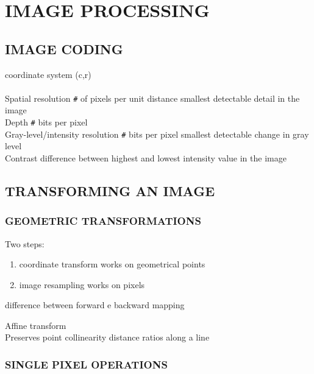 \documentclass[11pt,english]{article}
\begin{document}
\section{IMAGE PROCESSING}
	
\subsection{IMAGE CODING}						
coordinate system (c,r) \\ 
\\
Spatial resolution \makebox[0.5cm]{\textrightarrow} \verb|#| of pixels per unit distance \makebox[0.5cm]{\textrightarrow} smallest detectable detail in the image \\
Depth \makebox[0.5cm]{\textrightarrow} \verb|#| bits per pixel \\
Gray-level/intensity resolution \makebox[0.5cm]{\textrightarrow} \verb|#| bits per pixel \makebox[0.5cm]{\textrightarrow} smallest detectable change in gray level \\
Contrast \makebox[0.5cm]{\textrightarrow} difference between highest and lowest intensity value in the image \\

\subsection{TRANSFORMING AN IMAGE}

\subsubsection*{GEOMETRIC TRANSFORMATIONS}

Two steps: 
\begin{enumerate}
    \item coordinate transform \makebox[0.5cm]{\textrightarrow} works on geometrical points
    \item image resampling \makebox[0.5cm]{\textrightarrow} works on pixels
\end{enumerate}

difference between forward e backward mapping

\medskip

Affine transform \\
Preserves \makebox[0.5cm]{\textrightarrow} point collinearity
	  \makebox[0.5cm]{\textrightarrow} distance ratios along a line

\subsubsection*{SINGLE PIXEL OPERATIONS}
\end{document}

